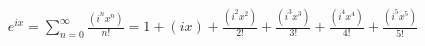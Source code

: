 \documentclass[preview]{standalone}
\begin{document}
\begin{align*}
e^{ix} = \sum_{n=0}^{\infty} \frac{(i^nx^n)}{n!} = 1 + (ix) + \frac{(i^2x^2)}{2!} + \frac{(i^3x^3)}{3!} + \frac{(i^4x^4)}{4!} + \frac{(i^5x^5)}{5!} \\
\end{align*}
\end{document}
